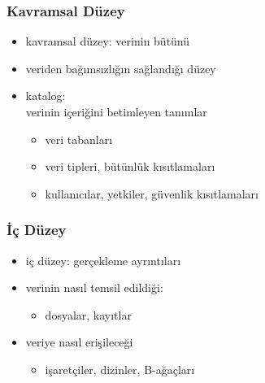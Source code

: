 \documentclass[dvipsnames]{beamer}
\theoremstyle{definition}
\theoremstyle{example}
\theoremstyle{plain}
\begin{document}
\begin{frame}
  \frametitle{Kavramsal Düzey}

  \begin{itemize}
    \item kavramsal düzey: verinin bütünü
    \item veriden bağımsızlığın sağlandığı düzey

    \pause
    \bigskip
    \item \alert{katalog}:\\
      verinin içeriğini betimleyen tanımlar
    \begin{itemize}
      \item veri tabanları
      \item veri tipleri, bütünlük kısıtlamaları
      \item kullanıcılar, yetkiler, güvenlik kısıtlamaları
    \end{itemize}
  \end{itemize}
\end{frame}

\begin{frame}
  \frametitle{İç Düzey}

  \begin{itemize}
    \item iç düzey: gerçekleme ayrıntıları

    \pause
    \item verinin nasıl temsil edildiği:
    \begin{itemize}
      \item dosyalar, kayıtlar
    \end{itemize}

    \pause
    \item veriye nasıl erişileceği
    \begin{itemize}
      \item işaretçiler, dizinler, B-ağaçları
    \end{itemize}
  \end{itemize}
\end{frame}
\end{document}
